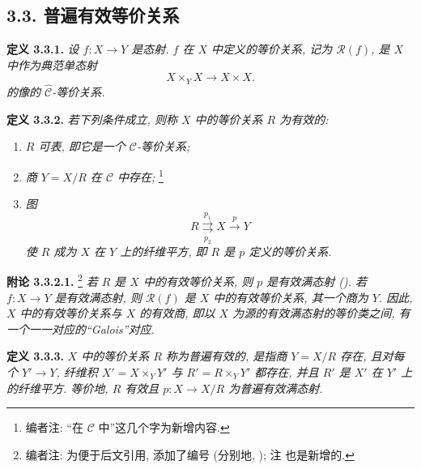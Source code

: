 \subsection*{3.3. 普遍有效等价关系}

\noindent{}\textbf{定义 3.3.1.}
\textit{设 \(f:X\to Y\) 是态射. \emph{\(f\) 在 \(X\) 中定义的等价关系},
记为 \(\mathscr R(f)\), 是 \(X\) 中作为典范单态射}
\[
  X\times_Y X\longrightarrow X\times X.
\]
\textit{的像的 \(\widehat{\mathscr C}\)-等价关系.}

\medskip
\noindent{}\textbf{定义 3.3.2.}
\textit{若下列条件成立, 则称 \(X\) 中的等价关系 \(R\) 为\emph{有效的}:}
\begin{enumerate}
  \item[(i)]
  \textit{\(R\) 可表, 即它是一个 \(\mathscr C\)-等价关系;}
  \item[(ii)]
  \textit{商 \(Y=X/R\) 在 \(\mathscr C\) 中存在;}
  \footnote{编者注: ``在 \(\mathscr C\) 中''这几个字为新增内容.}
  \item[(iii)]
  \textit{图}
  \[
    R\overset{p_1}{\underset{p_2}{\rightrightarrows}}
    X\xrightarrow{p}Y
  \]
  \textit{使 \(R\) 成为 \(X\) 在 \(Y\) 上的纤维平方,
  即 \(R\) 是 \(p\) 定义的等价关系.}
\end{enumerate}

\medskip
\noindent{}\textbf{附论 3.3.2.1.}
\footnote{编者注: 为便于后文引用, 添加了编号
(分别地, );
注  也是新增的.}
\textit{若 \(R\) 是 \(X\) 中的有效等价关系, 则 \(p\) 是有效满态射
(). 若 \(f:X\to Y\)
是有效满态射, 则 \(\mathscr R(f)\) 是 \(X\) 中的有效等价关系,
其一个商为 \(Y\). 因此, \(X\) 中的有效等价关系与 \(X\) 的有效商,
即以 \(X\) 为源的有效满态射的等价类之间, 有一个一一对应的``Galois''对应.}

\medskip
\noindent{}\textbf{定义 3.3.3.}
\textit{\(X\) 中的等价关系 \(R\) 称为\emph{普遍有效的},
是指商 \(Y=X/R\) 存在, 且对每个 \(Y'\to Y\),
纤维积 \(X'=X\times_Y Y'\) 与 \(R'=R\times_Y Y'\) 都存在,
并且 \(R'\) 是 \(X'\) 在 \(Y'\) 上的纤维平方.
等价地, \(R\) 有效且 \(p:X\to X/R\) 为普遍有效满态射.}


